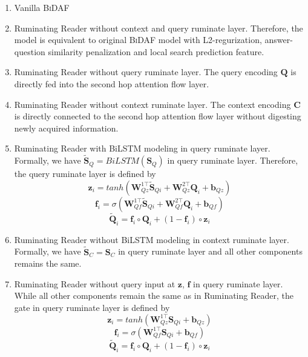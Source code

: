 \documentclass[11pt,letterpaper]{article}
\begin{document}
\begin{enumerate}
\item  Vanilla \textsc{BiDAF}
\item  Ruminating Reader without context and query ruminate layer. Therefore, the model is equivalent to original \textsc{BiDAF} model with L2-regurization, answer-question similarity penalization and local search prediction feature.
\item  Ruminating Reader without query ruminate layer. The query encoding $\bm{Q}$ is directly fed into the second hop attention flow layer. 
\item  Ruminating Reader without context ruminate layer. The context encoding $\bm{C}$ is directly connected to the second hop attention flow layer without digesting newly acquired information. 

\item  Ruminating Reader with BiLSTM modeling in query ruminate layer. Formally, we have $\tilde{\bm{S}}_Q = BiLSTM(\bm{S}_Q)$ in query ruminate layer. Therefore, the query ruminate layer is defined by
\begin{equation}
\bm{z}_i = tanh(\bm{W}^{1\top}_{Qz} \tilde{\bm{S}}_{Qi} + \bm{W}^{2\top}_{Qz}\bm{Q}_i + \bm{b}_{Qz})
\end{equation}
\begin{equation}
\bm{f}_i = \sigma(\bm{W}^{1\top}_{Qf} \tilde{\bm{S}}_{Qi} + \bm{W}^{2\top}_{Qf}\bm{Q}_i + \bm{b}_{Qf})
\end{equation}
\begin{equation}
\tilde{\bm{Q}}_i = \bm{f}_i \circ \bm{Q}_i + (1-\bm{f}_i)\circ \bm{z}_i
\end{equation}

\item  Ruminating Reader without BiLSTM modeling in context ruminate layer. Formally, we have $\tilde{\bm{S}}_C = \bm{S}_C$ in query ruminate layer and all other components remains the same.
\item  Ruminating Reader without query input at $\bm{z}$, $\bm{f}$ in query ruminate layer. While all other components remain the same as in Ruminating Reader, the gate in query ruminate layer is defined by
\begin{equation}
\bm{z}_i = tanh(\bm{W}^{1\top}_{Qz} \bm{S}_{Qi} + \bm{b}_{Qz})
\end{equation}
\begin{equation}
\bm{f}_i = \sigma(\bm{W}^{1\top}_{Qf}\bm{S}_{Qi} + \bm{b}_{Qf})
\end{equation}
\begin{equation}
\tilde{\bm{Q}}_i = \bm{f}_i \circ \bm{Q}_i + (1-\bm{f}_i)\circ \bm{z}_i
\end{equation}


\end{enumerate}
\end{document}
